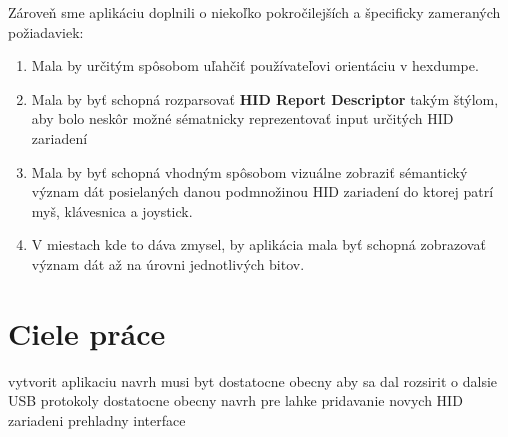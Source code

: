 Zároveň sme aplikáciu doplnili o niekoľko pokročilejších a špecificky zameraných požiadaviek:

\begin{enumerate}[label=\textbf{P\arabic*},resume]
	\item Mala by určitým spôsobom uľahčiť používateľovi orientáciu v hexdumpe.
	\item Mala by byť schopná rozparsovať \textbf{HID Report Descriptor} takým štýlom, aby bolo neskôr možné sématnicky reprezentovať input určitých HID zariadení
	\item Mala by byť schopná vhodným spôsobom vizuálne zobraziť sémantický význam dát posielaných danou podmnožinou HID zariadení do ktorej patrí myš, klávesnica a joystick.
	\item V miestach kde to dáva zmysel, by aplikácia mala byť schopná zobrazovať význam dát až na úrovni jednotlivých bitov.
\end{enumerate}

\section{Ciele práce}
vytvorit aplikaciu
navrh musi byt dostatocne obecny aby sa dal rozsirit o dalsie USB protokoly
dostatocne obecny navrh pre lahke pridavanie novych HID zariadeni
prehladny interface







